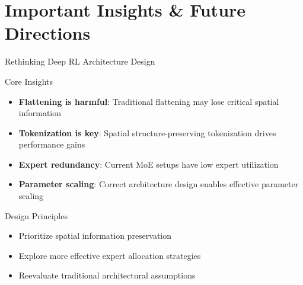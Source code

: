 \documentclass{beamer}
\begin{document}
\section{Important Insights \& Future Directions}

\begin{frame}{Rethinking Deep RL Architecture Design}
  \begin{block}{Core Insights}
    \begin{itemize}
      \item \textbf{Flattening is harmful}: Traditional flattening may lose critical spatial information
      \item \textbf{Tokenization is key}: Spatial structure-preserving tokenization drives performance gains
      \item \textbf{Expert redundancy}: Current MoE setups have low expert utilization
      \item \textbf{Parameter scaling}: Correct architecture design enables effective parameter scaling
    \end{itemize}
  \end{block}
  
  \begin{block}{Design Principles}
    \begin{itemize}
      \item Prioritize spatial information preservation
      \item Explore more effective expert allocation strategies
      \item Reevaluate traditional architectural assumptions
    \end{itemize}
  \end{block}
\end{frame}
\end{document}

